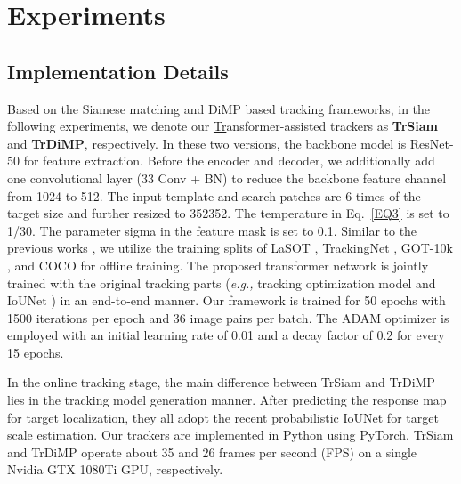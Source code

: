\documentclass[10pt,twocolumn,letterpaper]{article}
\begin{document}
\section{Experiments}


\subsection{Implementation Details}


Based on the Siamese matching and DiMP based tracking frameworks, in the following experiments, we denote our \underline{Tr}ansformer-assisted trackers as {\bf TrSiam} and {\bf TrDiMP}, respectively.
In these two versions, the backbone model is ResNet-50 \cite{ResNet} for feature extraction.
Before the encoder and decoder, we additionally add one convolutional layer (33 Conv + BN) to reduce the backbone feature channel from 1024 to 512.
The input template and search patches are 6 times of the target size and further resized to 352352.
The temperature  in Eq.~\ref{EQ3} is set to 1/30. The parameter sigma  in the feature mask is set to 0.1.
Similar to the previous works \cite{ATOM,DiMP,PrDiMP,KYS}, we utilize the training splits of LaSOT \cite{LaSOT}, TrackingNet \cite{2018trackingnet}, GOT-10k \cite{GOT10k}, and COCO \cite{COCO} for offline training.
The proposed transformer network is jointly trained with the original tracking parts (\emph{e.g.,} tracking optimization model \cite{DiMP} and IoUNet \cite{PrDiMP}) in an end-to-end manner. 
Our framework is trained for 50 epochs with 1500 iterations per epoch and 36 image pairs per batch.
The ADAM optimizer \cite{ADAM} is employed with an initial learning rate of 0.01 and a decay factor of 0.2 for every 15 epochs.



In the online tracking stage, the main difference between TrSiam and TrDiMP lies in the tracking model generation manner.
After predicting the response map for target localization, they all adopt the recent probabilistic IoUNet \cite{PrDiMP} for target scale estimation.
Our trackers are implemented in Python using PyTorch. 
TrSiam and TrDiMP operate about 35 and 26 frames per second (FPS) on a single Nvidia GTX 1080Ti GPU, respectively.
\end{document}
